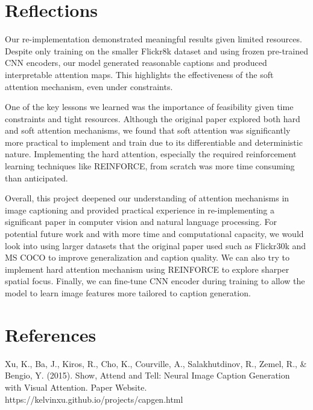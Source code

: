 \documentclass{article}
\begin{document}
\section{Reflections}


Our re-implementation demonstrated meaningful results given limited resources. Despite only training on the smaller Flickr8k dataset and using frozen pre-trained CNN encoders, our model generated reasonable captions and produced interpretable attention maps. This highlights the effectiveness of the soft attention mechanism, even under constraints.

One of the key lessons we learned was the importance of feasibility given time constraints and tight resources. Although the original paper explored both hard and soft attention mechanisms, we found that soft attention was significantly more practical to implement and train due to its differentiable and deterministic nature. Implementing the hard attention, especially the required reinforcement learning techniques like REINFORCE, from scratch was more time consuming than anticipated.

Overall, this project deepened our understanding of attention mechanisms in image captioning and provided practical experience in re-implementing a significant paper in computer vision and natural language processing. For potential future work and with more time and computational capacity, we would look into using larger datasets that the original paper used such as Flickr30k and MS COCO to improve generalization and caption quality. We can also try to implement hard attention mechanism using REINFORCE to explore sharper spatial focus. Finally, we can fine-tune CNN encoder during training to allow the model to learn image features more tailored to caption generation.


\section{References}

\noindent
[1] Xu, K., Ba, J., Kiros, R., Cho, K., Courville, A., Salakhutdinov, R., Zemel, R., \& Bengio, Y. (2015). Show, Attend and Tell: Neural Image Caption Generation with Visual Attention. Paper Website. \\ https://kelvinxu.github.io/projects/capgen.html\\
\end{document}
